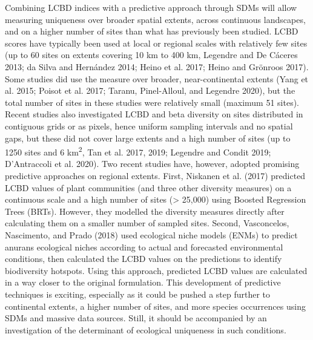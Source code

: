 \documentclass[10pt,oneside]{article}
\begin{document}
Combining LCBD indices with a predictive approach through SDMs will
allow measuring uniqueness over broader spatial extents, across
continuous landscapes, and on a higher number of sites than what has
previously been studied. LCBD scores have typically been used at local
or regional scales with relatively few sites (up to 60 sites on extents
covering 10 km to 400 km, Legendre and De Cáceres 2013; da Silva and
Hernández 2014; Heino et al. 2017; Heino and Grönroos 2017). Some
studies did use the measure over broader, near-continental extents (Yang
et al. 2015; Poisot et al. 2017; Taranu, Pinel-Alloul, and Legendre
2020), but the total number of sites in these studies were relatively
small (maximum 51 sites). Recent studies also investigated LCBD and beta
diversity on sites distributed in contiguous grids or as pixels, hence
uniform sampling intervals and no spatial gaps, but these did not cover
large extents and a high number of sites (up to 1250 sites and 6
km\textsuperscript{2}, Tan et al. 2017, 2019; Legendre and Condit 2019;
D'Antraccoli et al. 2020). Two recent studies have, however, adopted
promising predictive approaches on regional extents. First, Niskanen et
al. (2017) predicted LCBD values of plant communities (and three other
diversity measures) on a continuous scale and a high number of sites
(\textgreater{} 25,000) using Boosted Regression Trees (BRTs). However,
they modelled the diversity measures directly after calculating them on
a smaller number of sampled sites. Second, Vasconcelos, Nascimento, and
Prado (2018) used ecological niche models (ENMs) to predict anurans
ecological niches according to actual and forecasted environmental
conditions, then calculated the LCBD values on the predictions to
identify biodiversity hotspots. Using this approach, predicted LCBD
values are calculated in a way closer to the original formulation. This
development of predictive techniques is exciting, especially as it could
be pushed a step further to continental extents, a higher number of
sites, and more species occurrences using SDMs and massive data sources.
Still, it should be accompanied by an investigation of the determinant
of ecological uniqueness in such conditions.
\end{document}
